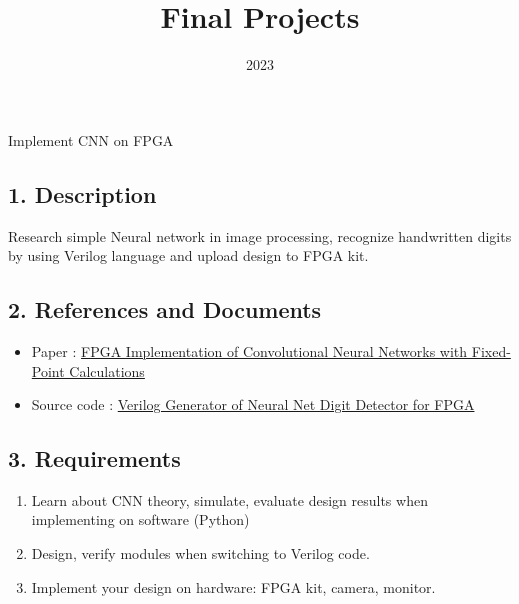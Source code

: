 \documentclass{vhdl-assignment}
\title{Final Projects}
\date{2023}
\begin{document}
\maketitle
\thispagestyle{fancy}

\begin{project}{Implement CNN on FPGA}
    \subsection*{1. Description}
    Research simple Neural network in image processing, recognize handwritten digits by using Verilog language and upload design to FPGA kit.
    \subsection*{2. References and Documents}
    \begin{itemize}
        \item Paper : \href{https://ieeexplore.ieee.org/document/8656778}{FPGA Implementation of Convolutional Neural Networks with Fixed-Point Calculations}
        \item Source code : \href{https://github.com/ZFTurbo/Verilog-Generator-of-Neural-Net-Digit-Detector-for-FPGA}{Verilog Generator of Neural Net Digit Detector for FPGA}
    \end{itemize}
    \subsection*{3. Requirements}
    \begin{enumerate}
        \item Learn about CNN theory, simulate, evaluate design results when implementing on software (Python)
        \item Design, verify modules when switching to Verilog code.
        \item Implement your design on hardware: FPGA kit, camera, monitor.
    \end{enumerate}
\end{project}
\end{document}

